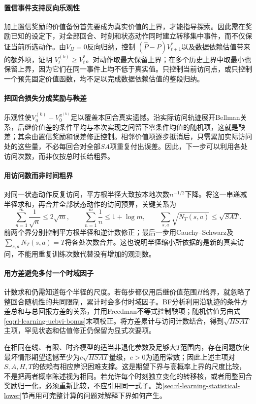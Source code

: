 \paragraph{置信事件支持反向乐观性}
加上置信奖励的价值备份首先要成为真实价值的上界，才能指导探索。因此需在奖励已知的设定下，对全部回合、时刻和状态动作同时建立转移集中事件，而不仅保证当前所选动作。由$V_H=0$反向归纳，控制
$(\widehat P-P)V^*_{t+1}$以及数据依赖估值带来的额外项，证明
$V_t^{(k)}\geq V_t^*$。对动作取最大保留上界；在多个历史上界中取最小也保留上界，因为它们在同一事件上均不低于真实值。只控制当前访问点，或只控制一个预先固定价值函数，均不足以完成数据依赖估值的整段归纳。

\paragraph{把回合损失分成奖励与鞅差}
乐观性使$V_0^{(k)}-V_0^{\pi^{(k)}}$足以覆盖本回合真实遗憾。沿实际访问轨迹展开Bellman关系，后继价值差的条件平均与本次实现之间留下零条件均值的随机项，这就是鞅差；其余由置信奖励和误差修正控制。相邻价值项逐步抵消后，只需累加实际访问处的这些量，不必每回合对全部$SA$项重复付出误差。因此，下一步可以利用各处访问次数，而非仅按总时长给粗界。

\paragraph{用访问数而非时间粗界}
对同一状态动作反复访问，平方根半径大致按本地次数$n^{-1/2}$下降。将这一串递减半径求和，再合并全部状态动作的访问预算，关键关系为
\[
  \sum_{n=1}^{m}\frac1{\sqrt n}\leq2\sqrt m,\qquad
  \sum_{n=1}^{m}\frac1n\leq1+\log m,\qquad
  \sum_{s,a}\sqrt{N_T(s,a)}\leq\sqrt{SAT}.
\]
前两个界分别控制平方根半径和逆计数修正；最后一步用Cauchy--Schwarz及$\sum_{s,a}N_T(s,a)=T$将各处次数合并。这也说明半径缩小所依据的是新的真实访问，不能用重复训练次数代替没有增加的观测数。

\paragraph{用方差避免多付一个时域因子}
计数求和仍需知道每个半径的尺度。若每步都仅用后继价值范围$H$给界，就忽略了整回合随机性的共同限制，累计时会多付时域因子。BF分析利用沿轨迹的条件方差总和与总回报方差的关系，并用Freedman不等式控制鞅项；随机估值另由式\eqref{eq:rl-learning-ucbvi-bonus}末项校正。将方差累计与访问计数结合，得到$\sqrt{HSAT}$主项，罕见状态和估值修正仍保留为显式次要项。

在相同在线、有限、时齐模型的适当非退化参数及足够大$T$范围内，存在问题族使最坏情形期望遗憾至少为$c\sqrt{HSAT}$量级，$c>0$为通用常数；因此上述主项对$S,A,H,T$的依赖有相应辨识困难支撑。这是期望下界与高概率上界的尺度比较，不是把两者概率陈述视为相同。若允许每个时刻独立变化的转移核，或者用整回合奖励归一化，必须重新比较，不应引用同一式子。第\ref{sec:rl-learning-statistical-lower}节再用可完整计算的问题对解释下界如何产生。

